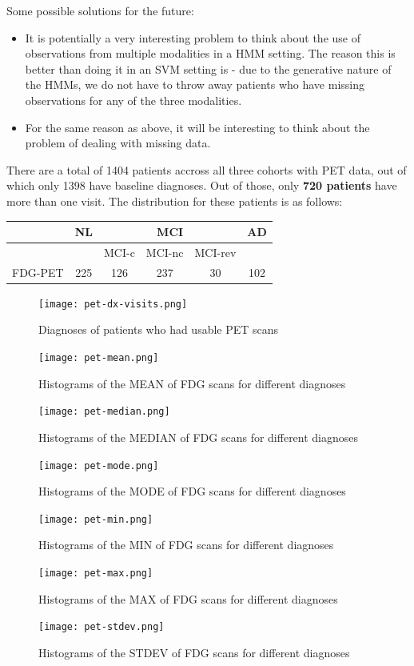 \documentclass[12pt,a4paper]{article}
\begin{document}
Some possible solutions for the future:

\begin{itemize}
\item It is potentially a very interesting problem to think about the
  use of observations from multiple modalities in a HMM setting. The
  reason this is better than doing it in an SVM setting is - due to
  the generative nature of the HMMs, we do not have to throw away
  patients who have missing observations for any of the three modalities.
\item For the same reason as above, it will be interesting to think
  about the problem of dealing with missing data.
\end{itemize}

There are a total of 1404 patients accross all three cohorts
with PET data, out of which only 1398 have baseline diagnoses. Out of
those, only \textbf{720 patients} have more than one visit. The
distribution for these patients is as follows:

\begin{tabular}[H]{c | c | c | c | c | c}
  & NL & \multicolumn{3}{|c|}{MCI} & AD\\
\hline
& & MCI-c & MCI-nc & MCI-rev &\\
\hline
FDG-PET & 225 & 126 & 237 & 30 & 102\\
\end{tabular}

\begin{figure}[H]
  \centering
  \texttt{[image: pet-dx-visits.png]}
  \caption{Diagnoses of patients who had usable PET scans}
\end{figure}

\begin{figure}[H]
  \centering
  \texttt{[image: pet-mean.png]}
  \caption{Histograms of the MEAN of FDG scans for different diagnoses}
\end{figure}
\begin{figure}[H]
  \centering
  \texttt{[image: pet-median.png]}
  \caption{Histograms of the MEDIAN of FDG scans for different diagnoses}
\end{figure}
\begin{figure}[H]
  \centering
  \texttt{[image: pet-mode.png]}
  \caption{Histograms of the MODE of FDG scans for different diagnoses}
\end{figure}
\begin{figure}[H]
  \centering
  \texttt{[image: pet-min.png]}
  \caption{Histograms of the MIN of FDG scans for different diagnoses}
\end{figure}
\begin{figure}[H]
  \centering
  \texttt{[image: pet-max.png]}
  \caption{Histograms of the MAX of FDG scans for different diagnoses}
\end{figure}
\begin{figure}[H]
  \centering
  \texttt{[image: pet-stdev.png]}
  \caption{Histograms of the STDEV of FDG scans for different diagnoses}
\end{figure}
\end{document}

